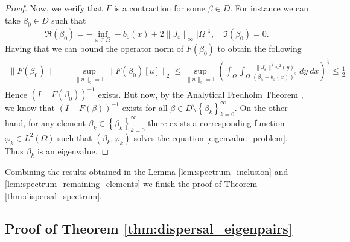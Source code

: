 \documentclass[12pt, a4paper]{article}
\theoremstyle{break}
\theoremstyle{break}
\theoremstyle{break}
\theoremstyle{break}
\theoremstyle{break}
\newcommand{\Seq}[2]{\left\{#1_#2\right\}_{#2 = 0}^\infty}
\newcommand{\Leb}{L^2\left(\Omega\right)}
\begin{document}
\begin{proof}
    Now, we verify that $F$ is a contraction for some $\beta \in D$. For instance we can take $\beta_0 \in D$ such that  
    $$\Re(\beta_0) = - \inf_{x \in \Omega} - b_\varepsilon(x) + 2 \|J_\varepsilon\|_\infty |\Omega|^\frac{1}{2}, \quad \Im(\beta_0) = 0.$$ 
    Having that we can bound the operator norm of $F(\beta_0)$ to obtain the following
    \begin{align*}
        \| F(\beta_0) \| &= \sup_{\|u\|_2=1} \|F(\beta_0)[u]\|_2 \leq \sup_{\|u\|_2 = 1} \left( \int_\Omega \int_\Omega \frac{\|J_\varepsilon\|^2 u^2(y)}{(\beta_0 - b_\varepsilon(x))^2}\:dy\:dx \right)^\frac{1}{2} \leq \frac{1}{2}
    \end{align*}
    Hence $(I - F(\beta_0))^{-1}$ exists. But now, by the Analytical Fredholm Theorem \cite{ReedSimon}, we know that $(I - F(\beta))^{-1}$ exists for all $\beta \in D \setminus \Seq{\beta}{k}$. On the other hand, for any element $\beta_k \in \Seq{\beta}{k}$ there exists a corresponding function $\varphi_k \in \Leb$ such that $(\beta_k, \varphi_k)$ solves the equation \eqref{eigenvalue_problem}. Thus $\beta_k$ is an eigenvalue.
\end{proof}
Combining the results obtained in the Lemma \ref{lem:spectrum_inclusion} and \ref{lem:spectrum_remaining_elements} we finish the proof of Theorem \ref{thm:dispersal_spectrum}.

\subsection{Proof of Theorem \ref{thm:dispersal_eigenpairs}}
\end{document}
